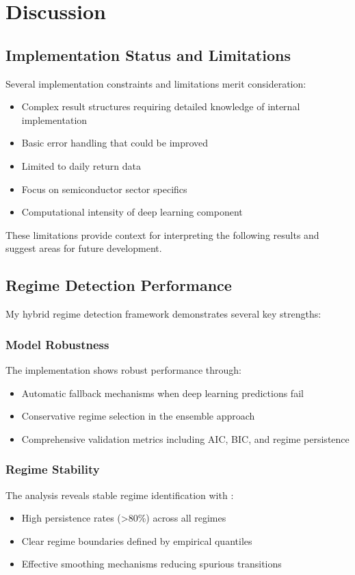 \section{Discussion}

\subsection{Implementation Status and Limitations}
Several implementation constraints and limitations merit consideration:
\begin{itemize}
    \item Complex result structures requiring detailed knowledge of internal implementation
    \item Basic error handling that could be improved
    \item Limited to daily return data
    \item Focus on semiconductor sector specifics
    \item Computational intensity of deep learning component
\end{itemize}

These limitations provide context for interpreting the following results and suggest areas for future development.

\subsection{Regime Detection Performance}
My hybrid regime detection framework \citep{hamilton1989new, fischer2018deep} demonstrates several key strengths:

\subsubsection{Model Robustness}
The implementation shows robust performance through:
\begin{itemize}
    \item Automatic fallback mechanisms when deep learning predictions fail \citep{hochreiter1997long}
    \item Conservative regime selection in the ensemble approach
    \item Comprehensive validation metrics including AIC, BIC, and regime persistence \citep{ang2002regime}
\end{itemize}

\subsubsection{Regime Stability}
The analysis reveals stable regime identification with \citep{guidolin2011regime}:
\begin{itemize}
    \item High persistence rates (>80\%) across all regimes
    \item Clear regime boundaries defined by empirical quantiles
    \item Effective smoothing mechanisms reducing spurious transitions
\end{itemize}

